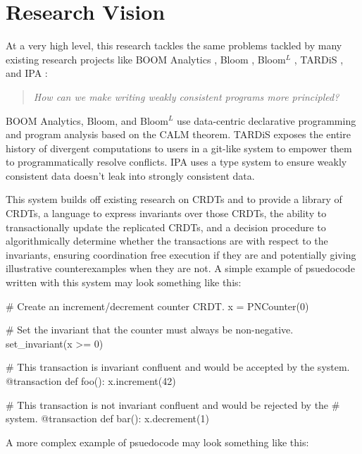 \section{Research Vision}
At a very high level, this research tackles the same problems tackled by many
existing research projects like BOOM Analytics \cite{alvaro2010boom}, Bloom
\cite{alvaro2011consistency}, Bloom$^L$ \cite{conway2012logic}, TARDiS
\cite{crookstardis}, and IPA \cite{holt2016disciplined}:

\begin{quotation}
  \emph{How can we make writing weakly consistent programs more principled?}
\end{quotation}

BOOM Analytics, Bloom, and Bloom$^L$ use data-centric declarative programming
and program analysis based on the CALM theorem. TARDiS exposes the entire
history of divergent computations to users in a git-like system to empower them
to programmatically resolve conflicts. IPA uses a type system to ensure weakly
consistent data doesn't leak into strongly consistent data.

This system builds off existing research on CRDTs and \iconfluence{} to provide
a library of CRDTs, a language to express invariants over those CRDTs, the
ability to transactionally update the replicated CRDTs, and a decision
procedure to algorithmically determine whether the transactions are
\iconfluent{} with respect to the invariants, ensuring coordination free
execution if they are and potentially giving illustrative counterexamples when
they are not. A simple example of psuedocode written with this system may look
something like this:

\begin{Python}
# Create an increment/decrement counter CRDT.
x = PNCounter(0)

# Set the invariant that the counter must always be non-negative.
set_invariant(x >= 0)

# This transaction is invariant confluent and would be accepted by the system.
@transaction
def foo():
  x.increment(42)

# This transaction is not invariant confluent and would be rejected by the
# system.
@transaction
def bar():
  x.decrement(1)
\end{Python}

A more complex example of psuedocode may look something like this:

